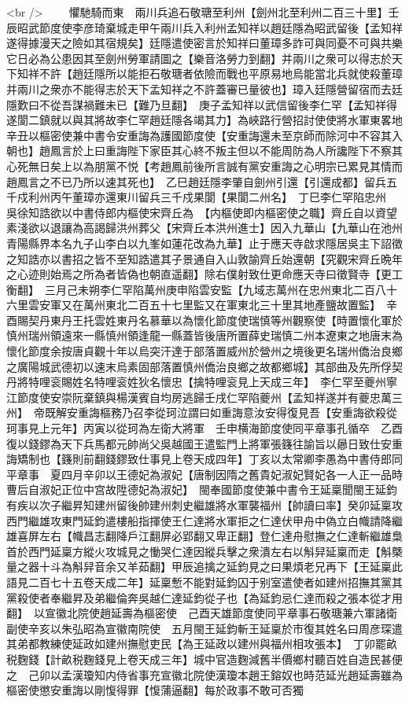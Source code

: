 <br />
　　懼馳騎而東　兩川兵追石敬瑭至利州【劍州北至利州二百三十里】壬辰昭武節度使李彦琦棄城走甲午兩川兵入利州孟知祥以趙廷隱為昭武留後【孟知祥遂得據漫天之險如其宿規矣】廷隱遣使密言於知祥曰董璋多詐可與同憂不可與共樂它日必為公患因其至劍州勞軍請圖之【樂音洛勞力到翻】并兩川之衆可以得志於天下知祥不許【趙廷隱所以能拒石敬瑭者依險而戰也平原易地烏能當北兵就使殺董璋并兩川之衆亦不能得志於天下孟知祥之不許蓋審已量彼也】璋入廷隱營留宿而去廷隱歎曰不從吾謀禍難未已【難乃旦翻】　庚子孟知祥以武信留後李仁罕【孟知祥得遂閬二鎮就以與其將故李仁罕趙廷隱各竭其力】為峽路行營招討使使將水軍東畧地　辛丑以樞密使兼中書令安重誨為護國節度使【安重誨還未至京師而除河中不容其入朝也】趙鳳言於上曰重誨陛下家臣其心終不叛主但以不能周防為人所讒陛下不察其心死無日矣上以為朋黨不悦【考趙鳳前後所言誠有黨安重誨之心明宗已累見其情而趙鳳言之不已乃所以速其死也】　乙巳趙廷隱李肇自劍州引還【引還成都】留兵五千戍利州丙午董璋亦還東川留兵三千戍果閬【果閬二州名】　丁巳李仁罕陷忠州　吳徐知誥欲以中書侍郎内樞使宋齊丘為　【内樞使即内樞密使之職】齊丘自以資望素淺欲以退讓為高謁歸洪州葬父【宋齊丘本洪州進士】因入九華山【九華山在池州青陽縣界本名九子山李白以九峯如蓮花改為九華】止于應天寺啟求隱居吳主下詔徵之知誥亦以書招之皆不至知誥遣其子景通自入山敦諭齊丘始還朝【究觀宋齊丘晩年之心迹則始焉之所為者皆偽也朝直遥翻】除右僕射致仕更命應天寺曰徵賢寺【更工衡翻】　三月己未朔李仁罕陷萬州庚申陷雲安監【九域志萬州在忠州東北二百八十六里雲安軍又在萬州東北二百五十七里監又在軍東北三十里其地產鹽故置監】　辛酉賜契丹東丹王托雲姓東丹名慕華以為懷化節度使瑞慎等州觀察使【時置懷化軍於慎州瑞州領遠來一縣慎州領逢龍一縣蓋皆後唐所置薛史瑞慎二州本遼東之地唐末為懷化節度余按唐貞觀十年以烏突汗達于部落置威州於營州之境後更名瑞州僑治良鄉之廣陽城武德初以速末烏素固部落置慎州僑治良鄉之故都鄉城】其部曲及先所俘契丹將特哩衮賜姓名特哩衮姓狄名懷忠【擒特哩衮見上天成三年】　李仁罕至夔州寧江節度使安崇阮棄鎮與楊漢賓自均房逃歸壬戌仁罕陷夔州【孟知祥遂并有夔忠萬三州】　帝既解安重誨樞務乃召李從珂泣謂曰如重誨意汝安得復見吾【安重誨欲殺從珂事見上元年】丙寅以從珂為左衛大將軍　壬申横海節度使同平章事孔循卒　乙酉復以錢鏐為天下兵馬都元帥尚父吳越國王遣監門上將軍張籛往諭旨以曏日致仕安重誨矯制也【籛則前翻錢鏐致仕事見上卷天成四年】丁亥以太常卿李愚為中書侍郎同平章事　夏四月辛卯以王德妃為淑妃【唐制因隋之舊貴妃淑妃賢妃各一人正一品時曹后自淑妃正位中宫故陞德妃為淑妃】　閩奉國節度使兼中書令王延稟聞閩王延鈞有疾以次子繼昇知建州留後帥建州刺史繼雄將水軍襲福州【帥讀曰率】癸卯延稟攻西門繼雄攻東門延鈞遣樓船指揮使王仁達將水軍拒之仁達伏甲舟中偽立白幟請降繼雄喜屏左右【幟昌志翻降戶江翻屏必郢翻又卑正翻】登仁達舟慰撫之仁達斬繼雄梟首於西門延稟方縱火攻城見之慟哭仁達因縱兵擊之衆潰左右以斛舁延稟而走【斛槩量之器十斗為斛舁音余又羊茹翻】甲辰追擒之延鈞見之曰果煩老兄再下【王延稟此語見二百七十五卷天成二年】延稟慙不能對延鈞囚于别室遣使者如建州招撫其黨其黨殺使者奉繼昇及弟繼倫奔吳越仁達延鈞從子也【為延鈞忌仁達而殺之張本從才用翻】　以宣徽北院使趙延壽為樞密使　己酉天雄節度使同平章事石敬瑭兼六軍諸衛副使辛亥以朱弘昭為宣徽南院使　五月閩王延鈞斬王延稟於市復其姓名曰周彦琛遣其弟都教練使延政如建州撫慰吏民【為王延政以建州與福州相攻張本】　丁卯罷畝税麴錢【計畝税麴錢見上卷天成三年】城中官造麴減舊半價鄉村聽百姓自造民甚便之　己卯以孟漢瓊知内侍省事充宣徽北院使漢瓊本趙王鎔奴也時范延光趙延壽雖為樞密使懲安重誨以剛愎得罪【愎蒲逼翻】每於政事不敢可否獨